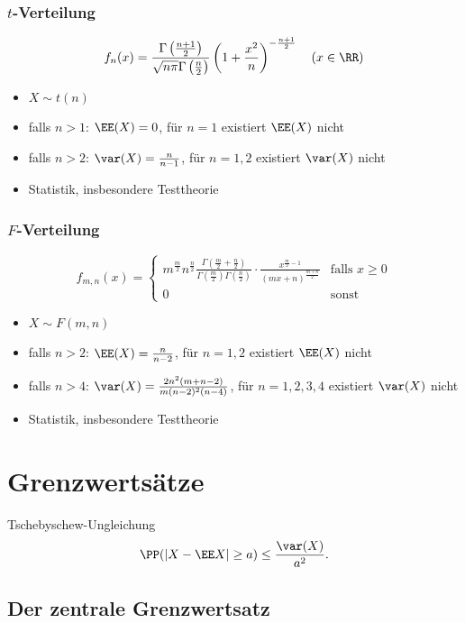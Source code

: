 \documentclass{scrreprt}
\begin{document}
\subsubsection{\texorpdfstring{$ t $}{t}-Verteilung}

\[ f_n(x)=\frac{\Gamma\left(\frac{n+1}{2}\right)}{\sqrt{n \pi}\Gamma\left(\frac{n}{2}\right)}\left(1+\frac{x^2}{n}\right)^{-\frac{n+1}{2}} \quad (x\in \RR) \]

\begin{itemize}
	\item $X\sim t(n)$
	\item falls $n>1$: $\EE(X)=0$, für $n=1$ existiert $\EE(X)$ nicht
	\item falls $n>2$: $\var(X)=\frac{n}{n-1}$, für $n=1,2$ existiert $\var(X)$ nicht
	\item Statistik, insbesondere Testtheorie
\end{itemize}

\subsubsection{\texorpdfstring{$ F $}{F}-Verteilung}

\[ f_{m,n}(x)=\begin{cases}
m^{\frac{m}{2}}n^{\frac{n}{2}}\frac{\Gamma\left(\frac{m}{2}+\frac{n}{2}\right)}{\Gamma\left(\frac{m}{2}\right)\Gamma\left(\frac{n}{2}\right)}\cdot \frac{x^{\frac{m}{2}-1}}{(mx+n)^{\frac{m+n}{2}}} & \text{falls }x\geq 0\\
0 & \text{sonst}
\end{cases} \] 
\begin{itemize}
	\item $X\sim F(m,n)$
	\item falls $n>2$: $\EE(X)=\frac{n}{n-2}$, für $n=1,2$ existiert $\EE(X)$ nicht
	\item falls $n>4$: $\var(X)=\frac{2n^2(m+n-2)}{m(n-2)^2(n-4)}$, für $n=1,2,3,4$ existiert $\var(X)$ nicht
	\item Statistik, insbesondere Testtheorie
\end{itemize}

\section{Grenzwertsätze}
Tschebyschew-Ungleichung
\[ \PP(|X-\EE X| \geq a) \leq \frac{\var(X)}{a^{2}} \text{.} \]

\subsection{Der zentrale Grenzwertsatz}
\end{document}
